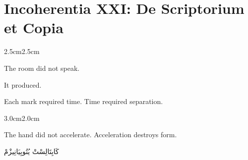 
\chapter*{Incoherentia XXI: De Scriptorium et Copia}

\pagestyle{incoherence}

\vspace{2em}

\begin{adjustwidth}{2.5cm}{2.5cm}

The room did not speak.

\medskip

It produced.

\vspace{2em}

Each mark required time. Time required separation.

\vspace{3em}

\end{adjustwidth}

\begin{center}
\end{center}

\vspace{2em}

\begin{adjustwidth}{3.0cm}{2.0cm}

The hand did not accelerate. Acceleration destroys form.

\vspace{3em}

\end{adjustwidth}

\begin{center}
\begin{AR}
كَابِتَالِسْتْ يُتُوبِيَانِيزْمْ
\end{AR}
\end{center}

